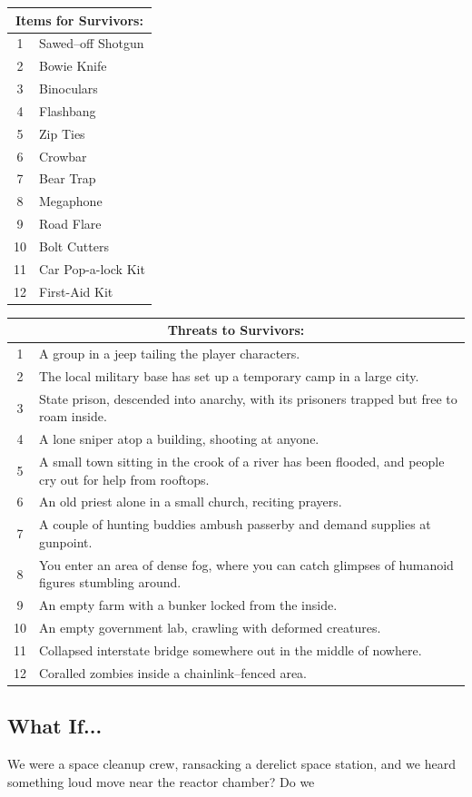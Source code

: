 \documentclass[a4,landscape]{book}
\begin{document}
\begin{multicols*}{4}
\begin{center}
  \begin{tabular}[ht]{|c|l|}
    \hline \multicolumn{2}{|c|}{Items for Survivors:} \\
    \hline 1 & Sawed--off Shotgun \\
    2 & Bowie Knife \\
    3 & Binoculars \\
    4 & Flashbang \\
    5 & Zip Ties \\
    6 & Crowbar \\
    7 & Bear Trap \\
    8 & Megaphone \\
    9 & Road Flare \\
    10 & Bolt Cutters \\
    11 & Car Pop-a-lock Kit \\
    12 & First-Aid Kit \\ \hline
  \end{tabular}
\end{center}

\columnbreak
\begin{center}
  \begin{tabular}{|c|p{}|}
    \hline \multicolumn{2}{|c|}{Threats to Survivors:} \\
    \hline 1 & A group in a jeep tailing the player characters. \\
    2 & The local military base has set up a temporary camp in a large city. \\
    3 & State prison, descended into anarchy, with its prisoners trapped but free to roam inside. \\
    4 & A lone sniper atop a building, shooting at anyone. \\
    5 & A small town sitting in the crook of a river has been flooded, and people cry out for help from rooftops. \\
    6 & An old priest alone in a small church, reciting prayers. \\
    7 & A couple of hunting buddies ambush passerby and demand supplies at gunpoint. \\
    8 & You enter an area of dense fog, where you can catch glimpses of humanoid figures stumbling around. \\
    9 & An empty farm with a bunker locked from the inside.  \\
    10 & An empty government lab, crawling with deformed creatures. \\
    11 & Collapsed interstate bridge somewhere out in the middle of nowhere. \\
    12 & Coralled zombies inside a chainlink--fenced area. \\ \hline
  \end{tabular}
\end{center}

\subsection*{What If...}

We were a space cleanup crew, ransacking a derelict space station, and we heard something loud move near the reactor chamber?
Do we 


\end{multicols*}
\end{document}
